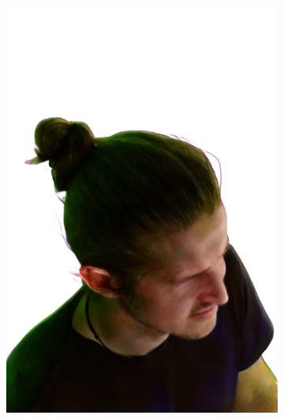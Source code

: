 \begin{figure}
\begin{subfigure}{0.18\linewidth}
        \includegraphics[width=\textwidth]{Figures/results/low/ephra_elf/15_render.png}
	\end{subfigure}
    \begin{subfigure}{0.18\linewidth}

\end{subfigure}
\end{figure}
